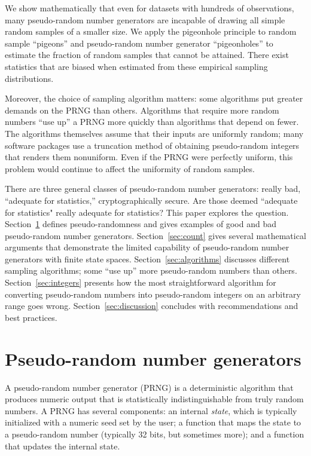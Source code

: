 \documentclass[graybox]{svmult}
\begin{document}
We show mathematically that even for datasets with hundreds of observations, many pseudo-random number generators
are incapable of drawing all simple random samples of a smaller size.
We apply the pigeonhole principle to random sample ``pigeons'' and pseudo-random number generator ``pigeonholes''
to estimate the fraction of random samples that cannot be attained.
There exist statistics that are biased when estimated from these empirical sampling distributions.

Moreover, the choice of sampling algorithm matters:
some algorithms put greater demands on the PRNG than others.
Algorithms that require more random numbers ``use up'' a PRNG more quickly than algorithms that depend on fewer.
The algorithms themselves assume that their inputs are uniformly random;
many software packages use a truncation method of obtaining pseudo-random integers that renders them nonuniform.
Even if the PRNG were perfectly uniform, this problem would continue to affect the uniformity of random samples.

There are three general classes of pseudo-random number generators: really bad, ``adequate for statistics,'' cryptographically secure.
Are those deemed ``adequate for statistics" really adequate for statistics?
This paper explores the question.
Section~\ref{sec:prngs} defines pseudo-randomness and gives examples of good and bad pseudo-random number generators.
Section~\ref{sec:count} gives several mathematical arguments that demonstrate the limited capability of pseudo-random number
generators with finite state spaces.
Section~\ref{sec:algorithms} discusses different sampling algorithms; some ``use up'' more pseudo-random numbers than others.
Section~\ref{sec:integers} presents how the most straightforward algorithm for converting pseudo-random numbers into pseudo-random integers on an arbitrary
range goes wrong.
Section~\ref{sec:discussion} concludes with recommendations and best practices.



\section{Pseudo-random number generators}
\label{sec:prngs}

A pseudo-random number generator (PRNG) is a deterministic algorithm that produces numeric output that is statistically indistinguishable
from truly random numbers.
A PRNG has several components:
an internal \emph{state}, which is typically initialized with a numeric seed set by the user;
a function that maps the state to a pseudo-random number (typically 32 bits, but sometimes more);
and a function that updates the internal state.
\end{document}
